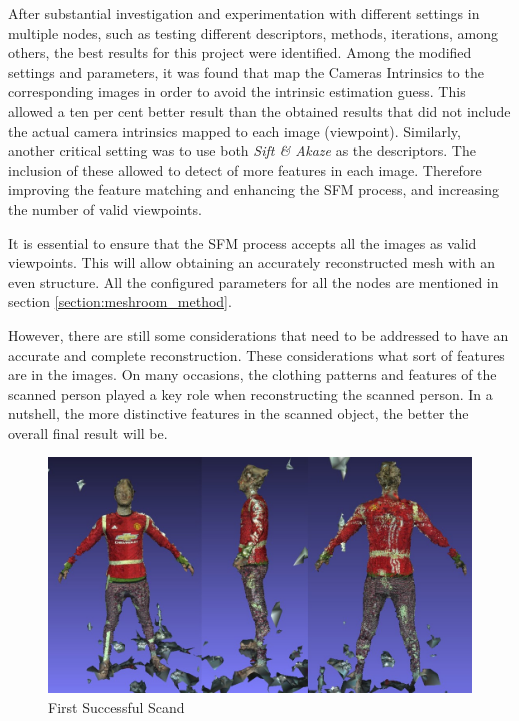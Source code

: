 \documentclass[12pt]{report}
\begin{document}
After substantial investigation and experimentation with different settings in multiple nodes, such as testing different descriptors, methods, iterations, among others, the best results for this project were identified.
Among the modified settings and parameters, it was found that map the Cameras Intrinsics to the corresponding images in order to avoid the intrinsic estimation guess. 
This allowed a ten per cent better result than the obtained results that did not include the actual camera intrinsics mapped to each image (viewpoint).
Similarly, another critical setting was to use both \textit{Sift \& Akaze} as the descriptors. The inclusion of these allowed to detect of more features in each image. 
Therefore improving the feature matching and enhancing the SFM process, and increasing the number of valid viewpoints.

It is essential to ensure that the SFM process accepts all the images as valid viewpoints. This will allow obtaining an accurately reconstructed mesh with an even structure.
All the configured parameters for all the nodes are mentioned in section \ref{section:meshroom_method}.

However, there are still some considerations that need to be addressed to have an accurate and complete reconstruction. 
These considerations what sort of features are in the images. On many occasions, the clothing patterns and features of the scanned person played a key role when reconstructing the scanned person. 
In a nutshell, the more distinctive features in the scanned object, the better the overall final result will be. 

\begin{figure}[H]%
  \centering
 \includegraphics[width=1\textwidth]{scan1.png}
\caption{First Successful Scand}
\label{fig:scan1} 
\end{figure}
\end{document}
